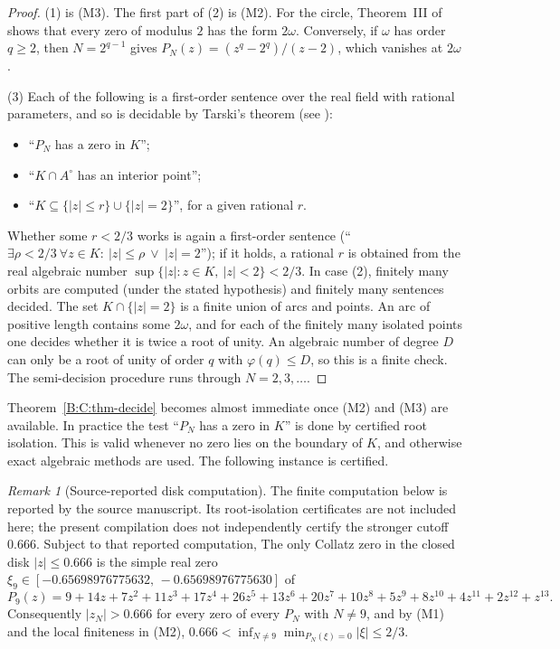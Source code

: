 \documentclass[11pt,a4paper]{article}
\theoremstyle{definition}
\theoremstyle{remark}
\newtheorem{remark}[theorem]{Remark}
\numberwithin{equation}{section}
\begin{document}
\begin{proof}
(1) is (M3).  The first part of (2) is (M2).  For the circle, Theorem~III of
\cite{R005} shows that every zero of modulus $2$ has the form $2\omega$.
Conversely, if $\omega$ has order $q\ge2$, then $N=2^{q-1}$ gives
$P_N(z)=(z^q-2^q)/(z-2)$, which vanishes at $2\omega$.

(3) Each of the following is a first-order sentence over the real field with
rational parameters, and so is decidable by Tarski's theorem
(see \cite{R034}):
\begin{itemize}
\item ``$P_N$ has a zero in $K$'';
\item ``$K\cap A^\circ$ has an interior point'';
\item ``$K\subseteq\{|z|\le r\}\cup\{|z|=2\}$'', for a given rational $r$.
\end{itemize}
Whether some $r<2/3$ works is again a first-order sentence
(``$\exists\rho<2/3\ \forall z\in K:\ |z|\le\rho\ \vee\ |z|=2$''); if it holds, a
rational $r$ is obtained from the real algebraic number
$\sup\{|z|:z\in K,\ |z|<2\}<2/3$.  In case (2), finitely
many orbits are computed (under the stated hypothesis) and finitely many sentences decided.  The set
$K\cap\{|z|=2\}$ is a finite union of arcs and points.  An arc of positive length
contains some $2\omega$, and for each of the finitely many isolated points one
decides whether it is twice a root of unity.  An algebraic number of degree $D$
can only be a root of unity of order $q$ with $\varphi(q)\le D$, so this is a
finite check.  The semi-decision procedure runs through $N=2,3,\dots$.
\end{proof}

Theorem~\ref{B:C:thm-decide} becomes almost immediate once (M2) and (M3) are
available.  In practice the test ``$P_N$ has a zero in $K$'' is done by certified
root isolation.  This is valid whenever no zero lies on the boundary of $K$, and
otherwise exact algebraic methods are used.  The following instance is
certified.

\begin{remark}[Source-reported disk computation]\label{B:C:cor-disk}
The finite computation below is reported by the source manuscript. Its
root-isolation certificates are not included here; the present compilation
does not independently certify the stronger cutoff $0.666$. Subject to that
reported computation,
The only Collatz zero in the closed disk $|z|\le 0.666$ is the simple real zero
$\xi_9\in[-0.65698976775632,\,-0.65698976775630]$ of
\[
P_9(z)=9+14z+7z^2+11z^3+17z^4+26z^5+13z^6+20z^7+10z^8+5z^9+8z^{10}+4z^{11}+2z^{12}+z^{13}.
\]
Consequently $|z_N|>0.666$ for every zero of every $P_N$ with $N\ne9$, and by
(M1) and the local finiteness in (M2), $0.666<\inf_{N\ne9}\min_{P_N(\xi)=0}|\xi|\le2/3$.
\end{remark}
\end{document}
